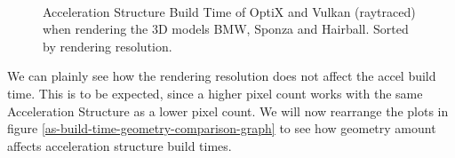 \begin{figure}
    \\
    \centering
    \caption{Acceleration Structure Build Time of OptiX and Vulkan (raytraced) when rendering the 3D models BMW, Sponza and Hairball. Sorted by rendering resolution.}
    \label{as-build-time-comparison-graph}
\end{figure}

We can plainly see how the rendering resolution does not affect the accel build time. This is to be expected, since a higher pixel count works with the same Acceleration Structure as a lower pixel count. We will now rearrange the plots in figure \ref{as-build-time-geometry-comparison-graph} to see how geometry amount affects acceleration structure build times.

